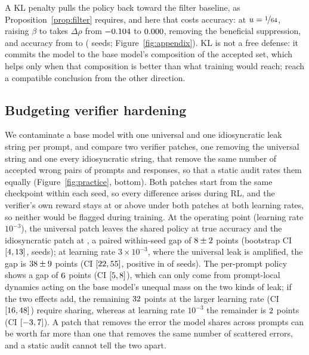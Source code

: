 \documentclass{article}
\theoremstyle{definition}
\begin{document}
A KL penalty pulls the policy back toward the filter baseline, as Proposition~\ref{prop:filter} requires, and here that costs accuracy: at $u=\nicefrac{1}{64}$, raising $\beta$ to \NuFiveBBeta{} takes $\Delta\rho$ from $-0.104{}$ to $0.000{}$, removing the beneficial suppression, and accuracy from \NuFiveBAccNoKLLo{} to \NuFiveBAccKLLo{} (\NuFiveBNSeeds{} seeds; Figure~\ref{fig:appendix}). KL is not a free defense: it commits the model to the base model's composition of the accepted set, which helps only when that composition is better than what training would reach; \citet{ackermann2026gradreg} reach a compatible conclusion from the other direction.

\subsection{Budgeting verifier hardening}
\label{sec:hardening}

We contaminate a base model with one universal and one idiosyncratic leak string per prompt, and compare two verifier patches, one removing the universal string and one every idiosyncratic string, that remove the same number of accepted wrong pairs of prompts and responses, so that a static audit rates them equally (Figure~\ref{fig:practice}, bottom). Both patches start from the same checkpoint within each seed, so every difference arises during RL, and the verifier's own reward stays at \NuFiveCLkyMin{} or above under both patches at both learning rates, so neither would be flagged during training. At the operating point (learning rate $10^{-3}$), the universal patch leaves the shared policy at \NuFiveCAccU{} true accuracy and the idiosyncratic patch at \NuFiveCAccI{}, a paired within-seed gap of $8{}\pm2{}$ points (bootstrap CI $[4, 13]{}$, \NuFiveCNSeeds{} seeds); at learning rate $3\times10^{-3}$, where the universal leak is amplified, the gap is $38{}\pm9{}$ points (CI $[22, 55]{}$, positive in \NuFiveCGapHiLrNPos{} of \NuFiveCNSeeds{} seeds). The per-prompt policy shows a gap of $6{}$ points (CI $[5, 8]{}$), which can only come from prompt-local dynamics acting on the base model's unequal mass on the two kinds of leak; if the two effects add, the remaining $32{}$ points at the larger learning rate (CI $[16, 48]{}$) require sharing, whereas at learning rate $10^{-3}$ the remainder is $2{}$ points (CI $[-3, 7]{}$). A patch that removes the error the model shares across prompts can be worth far more than one that removes the same number of scattered errors, and a static audit cannot tell the two apart.
\end{document}
